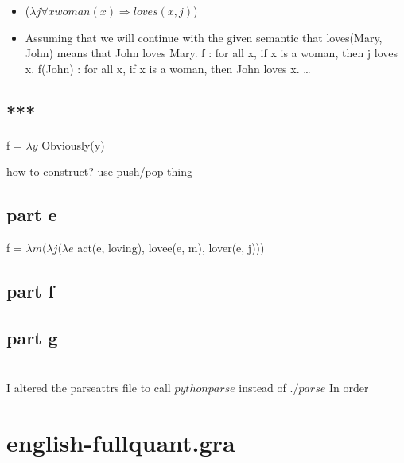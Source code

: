 \documentclass[12pt, letterpaper]{article}
\begin{document}
\begin{itemize}  
\item %
($\lambda j \forall x woman(x) \Rightarrow loves(x,j)$) 
\item %
Assuming that we will continue with the given semantic that loves(Mary, John) means that John loves Mary.
f : for all x, if x is a woman, then j loves x.
f(John) : for all x, if x is a woman, then John loves x.
\ldots 
\end{itemize}

\subsection{***}

f = $\lambda y$ Obviously(y)

how to construct? use push/pop thing

\subsection{part e}
f = $\lambda m ( \lambda j ( \lambda e$ act(e, loving), lovee(e, m), lover(e, j)))

\subsection{part f}

\subsection{part g}




\section{}
I altered the parseattrs file to call
$python parse$
instead of $./parse$
In order


\section{english-fullquant.gra}
\end{document}
